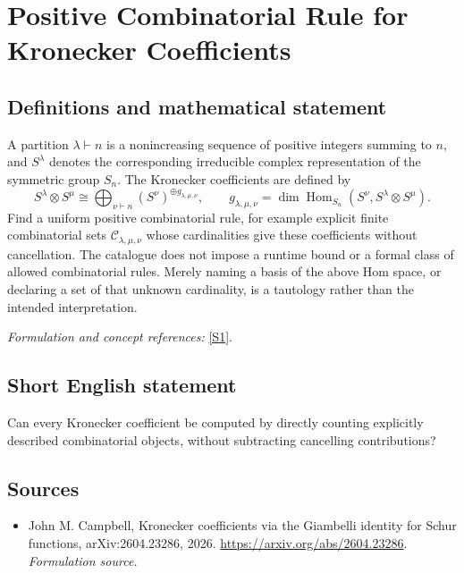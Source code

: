 \documentclass[11pt]{article}
\begin{document}
\section*{\texorpdfstring{Positive Combinatorial Rule for Kronecker Coefficients}{Positive Combinatorial Rule for Kronecker Coefficients}}\label{375}
\subsection{Definitions and mathematical statement}
A partition $\lambda\vdash n$ is a nonincreasing sequence of positive integers summing to $n$, and $S^\lambda$ denotes the corresponding irreducible complex representation of the symmetric group $S_n$. The Kronecker coefficients are defined by
\[
 S^\lambda\otimes S^\mu\cong
 \bigoplus_{\nu\vdash n}(S^\nu)^{\oplus g_{\lambda,\mu,\nu}},
 \qquad
 g_{\lambda,\mu,\nu}=\dim\operatorname{Hom}_{S_n}
 (S^\nu,S^\lambda\otimes S^\mu).
\]
Find a uniform positive combinatorial rule, for example explicit finite combinatorial sets $\mathcal C_{\lambda,\mu,\nu}$ whose cardinalities give these coefficients without cancellation. The catalogue does not impose a runtime bound or a formal class of allowed combinatorial rules. Merely naming a basis of the above Hom space, or declaring a set of that unknown cardinality, is a tautology rather than the intended interpretation.
\par\smallskip\textit{Formulation and concept references:} \href{https://arxiv.org/abs/2604.23286}{[S1]}.

\subsection{Short English statement}
Can every Kronecker coefficient be computed by directly counting explicitly described combinatorial objects, without subtracting cancelling contributions?
\subsection{Sources}
\begin{itemize}
\item[S1]John M. Campbell, Kronecker coefficients via the Giambelli identity for Schur functions, arXiv:2604.23286, 2026.
\url{https://arxiv.org/abs/2604.23286}.
\textit{Formulation source.}
\end{itemize}
\end{document}
